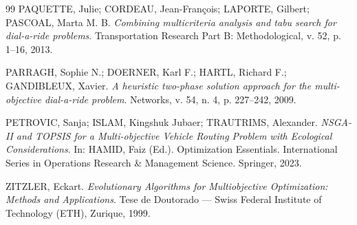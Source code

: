 \documentclass[12pt,a4paper]{article}
\theoremstyle{plain}
\begin{document}
\begin{thebibliography}{99}
PAQUETTE, Julie; CORDEAU, Jean-Fran\c{c}ois; LAPORTE, Gilbert; PASCOAL, Marta M. B.
\textit{Combining multicriteria analysis and tabu search for dial-a-ride problems}.
Transportation Research Part B: Methodological, v. 52, p. 1--16, 2013.

PARRAGH, Sophie N.; DOERNER, Karl F.; HARTL, Richard F.; GANDIBLEUX, Xavier.
\textit{A heuristic two-phase solution approach for the multi-objective dial-a-ride problem}.
Networks, v. 54, n. 4, p. 227--242, 2009.

PETROVIC, Sanja; ISLAM, Kingshuk Jubaer; TRAUTRIMS, Alexander.
\textit{NSGA-II and TOPSIS for a Multi-objective Vehicle Routing Problem with Ecological Considerations}.
In: HAMID, Faiz (Ed.). Optimization Essentials. International Series in Operations Research \& Management Science. Springer, 2023.

ZITZLER, Eckart.
\textit{Evolutionary Algorithms for Multiobjective Optimization: Methods and Applications}.
Tese de Doutorado --- Swiss Federal Institute of Technology (ETH), Zurique, 1999.

\end{thebibliography}
\end{document}
